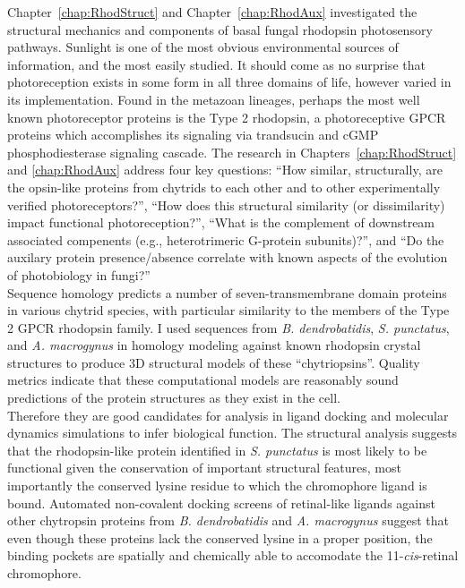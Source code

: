 \indent Chapter~\ref{chap:RhodStruct} and Chapter~\ref{chap:RhodAux} investigated the structural mechanics and components of basal fungal rhodopsin photosensory pathways. Sunlight is one of the most obvious environmental sources of information, and the most easily studied. It should come as no surprise that photoreception exists in some form in all three domains of life, however varied in its implementation. Found in the metazoan lineages, perhaps the most well known photoreceptor proteins is the Type 2 rhodopsin, a photoreceptive GPCR proteins which accomplishes its signaling via trandsucin and cGMP phosphodiesterase signaling cascade. The research in Chapters~\ref{chap:RhodStruct} and \ref{chap:RhodAux} address four key questions: \enquote{How similar, structurally, are the opsin-like proteins from chytrids to each other and to other experimentally verified photoreceptors?}, \enquote{How does this structural similarity (or dissimilarity) impact functional photoreception?}, \enquote{What is the complement of downstream associated compenents (e.g., heterotrimeric G-protein subunits)?}, and \enquote{Do the auxilary protein presence/absence correlate with known aspects of the evolution of photobiology in fungi?} \\
\indent Sequence homology predicts a number of seven-transmembrane domain proteins in various chytrid species, with particular similarity to the members of the Type 2 GPCR rhodopsin family. I used sequences from \textit{B. dendrobatidis}, \textit{S. punctatus}, and \textit{A. macrogynus} in homology modeling against known rhodopsin crystal structures to produce 3D structural models of these \enquote{chytriopsins}. Quality metrics indicate that these computational models are reasonably sound predictions of the protein structures as they exist in the cell.\\
\indent Therefore they are good candidates for analysis in ligand docking and molecular dynamics simulations to infer biological function. The structural analysis suggests that the rhodopsin-like protein identified in \textit{S. punctatus} is most likely to be functional given the conservation of important structural features, most importantly the conserved lysine residue to which the chromophore ligand is bound. Automated non-covalent docking screens of retinal-like ligands against other chytropsin proteins from \textit{B. dendrobatidis} and \textit{A. macrogynus} suggest that even though these proteins lack the conserved lysine in a proper position, the binding pockets are spatially and chemically able to accomodate the 11-\textit{cis}-retinal chromophore.\\
